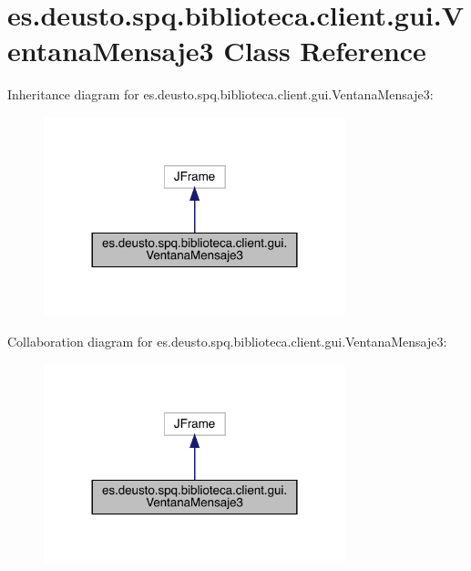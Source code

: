\hypertarget{classes_1_1deusto_1_1spq_1_1biblioteca_1_1client_1_1gui_1_1_ventana_mensaje3}{}\section{es.\+deusto.\+spq.\+biblioteca.\+client.\+gui.\+Ventana\+Mensaje3 Class Reference}
\label{classes_1_1deusto_1_1spq_1_1biblioteca_1_1client_1_1gui_1_1_ventana_mensaje3}


Inheritance diagram for es.\+deusto.\+spq.\+biblioteca.\+client.\+gui.\+Ventana\+Mensaje3\+:
\nopagebreak
\begin{figure}[H]
\begin{center}
\leavevmode
\includegraphics[width=248pt]{classes_1_1deusto_1_1spq_1_1biblioteca_1_1client_1_1gui_1_1_ventana_mensaje3__inherit__graph}
\end{center}
\end{figure}


Collaboration diagram for es.\+deusto.\+spq.\+biblioteca.\+client.\+gui.\+Ventana\+Mensaje3\+:
\nopagebreak
\begin{figure}[H]
\begin{center}
\leavevmode
\includegraphics[width=248pt]{classes_1_1deusto_1_1spq_1_1biblioteca_1_1client_1_1gui_1_1_ventana_mensaje3__coll__graph}
\end{center}
\end{figure}
